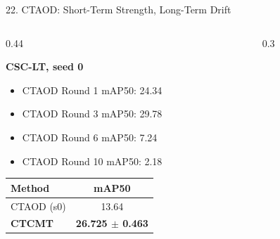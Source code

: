 \documentclass[aspectratio=169,11pt]{beamer}
\begin{document}
\begin{frame}{22. CTAOD: Short-Term Strength, Long-Term Drift}

\scriptsize

\begin{columns}[T,onlytextwidth]

\begin{column}{0.44\textwidth}

\textbf{CSC-LT, seed 0}

\vspace{0.03em}

{\tiny
\begin{itemize}
    \setlength{\itemsep}{0pt}
    \setlength{\parskip}{0pt}
    \setlength{\parsep}{0pt}
    \setlength{\topsep}{1pt}
    \item CTAOD Round 1 mAP50: 24.34
    \item CTAOD Round 3 mAP50: 29.78
    \item CTAOD Round 6 mAP50: 7.24
    \item CTAOD Round 10 mAP50: 2.18
\end{itemize}
}

\vspace{-0.30em}

\hspace*{1.45em}
\begin{minipage}{0.72\linewidth}
\tiny
\setlength{\tabcolsep}{4pt}
\renewcommand{\arraystretch}{0.95}

\begin{tabular}{@{}lc@{}}
\toprule
\textbf{Method} & \textbf{mAP50} \\
\midrule
CTAOD (s0) & 13.64 \\
\textbf{CTCMT} & \textbf{26.725 $\pm$ 0.463} \\
\bottomrule
\end{tabular}
\end{minipage}

\end{column}

\hfill

\begin{column}{0.3\textwidth}


\end{column}
\end{columns}
\end{frame}
\end{document}
